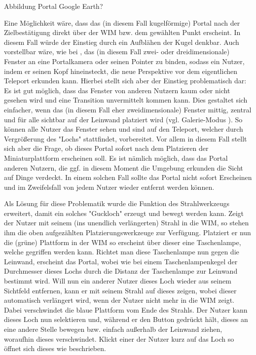 Abbildung Portal Google Earth?

Eine Möglichkeit wäre, dass das (in diesem Fall kugelförmige) Portal nach der Zielbestätigung direkt über der WIM bzw. dem gewählten Punkt erscheint. In diesem Fall würde der Einstieg durch ein Aufblähen der Kugel denkbar.
Auch vorstellbar wäre, wie bei \cite{Kunert2014Photoportals}, das (in diesem Fall zwei- oder dreidimensionale) Fenster an eine Portalkamera oder seinen Pointer zu binden, sodass ein Nutzer, indem er seinen Kopf hineinsteckt, die neue Perspektive vor dem eigentlichen Teleport erkunden kann. Hierbei stellt sich aber der Einstieg problematisch dar: Es ist gut möglich, dass das Fenster von anderen Nutzern kaum oder nicht gesehen wird und eine Transition unvermittelt kommen kann.
Dies gestaltet sich einfacher, wenn das (in diesem Fall eher zweidimensionale) Fenster mittig, zentral und für alle sichtbar auf der Leinwand platziert wird (vgl. Galerie-Modus \cite{Kunert2014Photoportals}). So können  alle Nutzer das Fenster sehen und sind auf den Teleport, welcher durch Vergrößerung des "Lochs" stattfindet, vorbereitet.
Vor allem in diesem Fall stellt sich aber die Frage, ob dieses Portal sofort nach dem Platzieren der Miniaturplattform erscheinen soll. Es ist nämlich möglich, dass das Portal anderen Nutzern, die ggf. in diesem Moment die Umgebung erkunden die Sicht auf Dinge verdeckt. In einem solchen Fall sollte das Portal nicht sofort Erscheinen und im Zweifelsfall von jedem Nutzer wieder entfernt werden können.

Als Lösung für diese Problematik wurde die Funktion des Strahlwerkzeugs erweitert, damit ein solches "Guckloch" erzeugt und bewegt werden kann.
Zeigt der Nutzer mit seinem (ins unendlich verlängerten) Strahl in die WIM, so stehen ihm die oben aufgezählten Platzierungswerkzeuge zur Verfügung. Platziert er nun die (grüne) Plattform in der WIM so erscheint über dieser eine Taschenlampe, welche gegriffen werden kann. Richtet man diese Taschenlampe nun gegen die Leinwand, erscheint das Portal, wobei wie bei einem Taschenlampenkegel der Durchmesser dieses Lochs durch die Distanz der Taschenlampe zur Leinwand bestimmt wird. Will nun ein anderer Nutzer dieses Loch wieder aus seinem Sichtfeld entfernen, kann er mit seinem Strahl auf dieses zeigen, wobei dieser automatisch verlängert wird, wenn der Nutzer nicht mehr in die WIM zeigt. Dabei verschwindet die blaue Plattform vom Ende des Strahls. Der Nutzer kann dieses Loch nun selektieren und, während er den Button gedrückt hält, dieses an eine andere Stelle bewegen bzw. einfach außerhalb der Leinwand ziehen, woraufhin dieses verschwindet.
Klickt einer der Nutzer kurz auf das Loch so öffnet sich dieses wie beschrieben.

